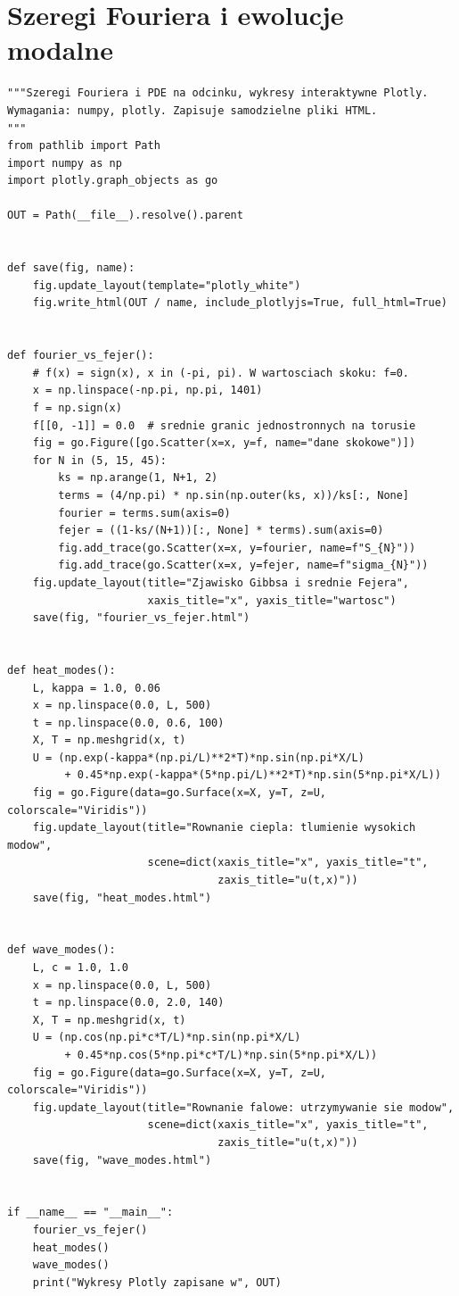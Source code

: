 \section{Szeregi Fouriera i ewolucje modalne}
\begin{lstlisting}[style=pythonpde,caption={Średnie Fejéra, Gibbs oraz powierzchnie ewolucji: Plotly},label={code:pde-fourier}]
"""Szeregi Fouriera i PDE na odcinku, wykresy interaktywne Plotly.
Wymagania: numpy, plotly. Zapisuje samodzielne pliki HTML.
"""
from pathlib import Path
import numpy as np
import plotly.graph_objects as go

OUT = Path(__file__).resolve().parent


def save(fig, name):
    fig.update_layout(template="plotly_white")
    fig.write_html(OUT / name, include_plotlyjs=True, full_html=True)


def fourier_vs_fejer():
    # f(x) = sign(x), x in (-pi, pi). W wartosciach skoku: f=0.
    x = np.linspace(-np.pi, np.pi, 1401)
    f = np.sign(x)
    f[[0, -1]] = 0.0  # srednie granic jednostronnych na torusie
    fig = go.Figure([go.Scatter(x=x, y=f, name="dane skokowe")])
    for N in (5, 15, 45):
        ks = np.arange(1, N+1, 2)
        terms = (4/np.pi) * np.sin(np.outer(ks, x))/ks[:, None]
        fourier = terms.sum(axis=0)
        fejer = ((1-ks/(N+1))[:, None] * terms).sum(axis=0)
        fig.add_trace(go.Scatter(x=x, y=fourier, name=f"S_{N}"))
        fig.add_trace(go.Scatter(x=x, y=fejer, name=f"sigma_{N}"))
    fig.update_layout(title="Zjawisko Gibbsa i srednie Fejera",
                      xaxis_title="x", yaxis_title="wartosc")
    save(fig, "fourier_vs_fejer.html")


def heat_modes():
    L, kappa = 1.0, 0.06
    x = np.linspace(0.0, L, 500)
    t = np.linspace(0.0, 0.6, 100)
    X, T = np.meshgrid(x, t)
    U = (np.exp(-kappa*(np.pi/L)**2*T)*np.sin(np.pi*X/L)
         + 0.45*np.exp(-kappa*(5*np.pi/L)**2*T)*np.sin(5*np.pi*X/L))
    fig = go.Figure(data=go.Surface(x=X, y=T, z=U, colorscale="Viridis"))
    fig.update_layout(title="Rownanie ciepla: tlumienie wysokich modow",
                      scene=dict(xaxis_title="x", yaxis_title="t",
                                 zaxis_title="u(t,x)"))
    save(fig, "heat_modes.html")


def wave_modes():
    L, c = 1.0, 1.0
    x = np.linspace(0.0, L, 500)
    t = np.linspace(0.0, 2.0, 140)
    X, T = np.meshgrid(x, t)
    U = (np.cos(np.pi*c*T/L)*np.sin(np.pi*X/L)
         + 0.45*np.cos(5*np.pi*c*T/L)*np.sin(5*np.pi*X/L))
    fig = go.Figure(data=go.Surface(x=X, y=T, z=U, colorscale="Viridis"))
    fig.update_layout(title="Rownanie falowe: utrzymywanie sie modow",
                      scene=dict(xaxis_title="x", yaxis_title="t",
                                 zaxis_title="u(t,x)"))
    save(fig, "wave_modes.html")


if __name__ == "__main__":
    fourier_vs_fejer()
    heat_modes()
    wave_modes()
    print("Wykresy Plotly zapisane w", OUT)
\end{lstlisting}

